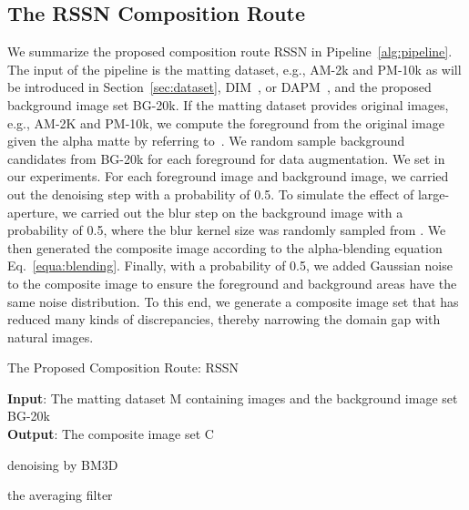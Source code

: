 \documentclass[twocolumn]{svjour3}
\begin{document}
\subsection{The RSSN Composition Route}
\label{subsec:compositionroute}
We summarize the proposed composition route RSSN in Pipeline~\ref{alg:pipeline}. The input of the pipeline is the matting dataset, e.g., AM-2k and PM-10k as will be introduced in Section~\ref{sec:dataset}, DIM~\citep{xu2017deep}, or DAPM~\citep{shen2016deep}, and the proposed background image set BG-20k. If the matting dataset provides original images, e.g., AM-2K and PM-10k, we compute the foreground from the original image given the alpha matte by referring to~\citep{levin2007closed}. We random sample  background candidates from BG-20k for each foreground for data augmentation. We set  in our experiments. For each foreground image and background image, we carried out the denoising step with a probability of 0.5. To simulate the effect of large-aperture, we carried out the blur step on the background image with a probability of 0.5, where the blur kernel size was randomly sampled from . We then generated the composite image according to the alpha-blending equation Eq.~\eqref{equa:blending}. Finally, with a probability of 0.5, we added Gaussian noise to the composite image to ensure the foreground and background areas have the same noise distribution. To this end, we generate a composite image set that has reduced many kinds of discrepancies, thereby narrowing the domain gap with natural images.


\begin{algorithm}
\caption{The Proposed Composition Route: RSSN} 
\label{alg:pipeline}
\textbf{Input}: The matting dataset M containing  images and
the background image set BG-20k  \\
\textbf{Output}: The composite image set C
\begin{algorithmic}[1]

\ELSE 
{} 
\ENDIF 


\IF{}
\STATE {  } denoising by BM3D \citep{dabov2009bm3d}
\STATE {  }
\ENDIF 

\IF{}
\STATE { }  the averaging filter
\ENDIF 


\IF{}
\STATE { }

\ENDIF 
\ENDFOR
\ENDFOR
\end{algorithmic}
\end{algorithm}
\end{document}
